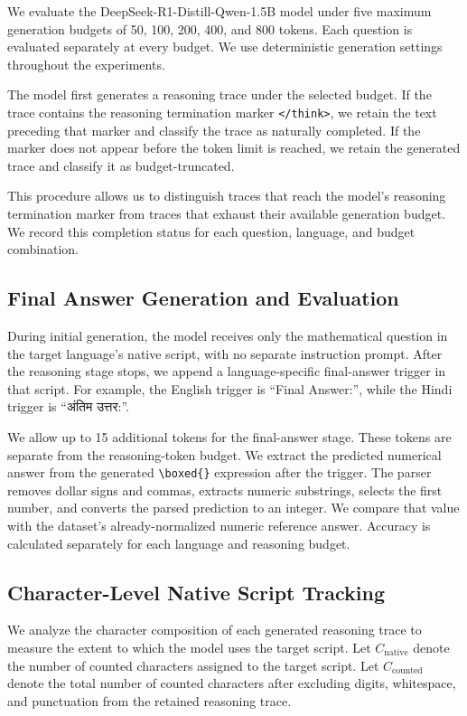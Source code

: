 \documentclass[11pt]{article}
\begin{document}
We evaluate the DeepSeek-R1-Distill-Qwen-1.5B model under five maximum generation budgets of 50, 100, 200, 400, and 800 tokens. Each question is evaluated separately at every budget. We use deterministic generation settings throughout the experiments.

The model first generates a reasoning trace under the selected budget. If the trace contains the reasoning termination marker \texttt{</think>}, we retain the text preceding that marker and classify the trace as naturally completed. If the marker does not appear before the token limit is reached, we retain the generated trace and classify it as budget-truncated.

This procedure allows us to distinguish traces that reach the model's reasoning termination marker from traces that exhaust their available generation budget. We record this completion status for each question, language, and budget combination.

\subsection{Final Answer Generation and Evaluation}
\label{sec:method_answer}

During initial generation, the model receives only the mathematical question in the target language's native script, with no separate instruction prompt. After the reasoning stage stops, we append a language-specific final-answer trigger in that script. For example, the English trigger is ``Final Answer:'', while the Hindi trigger is ``{\hindifont अंतिम उत्तर:}''.

We allow up to 15 additional tokens for the final-answer stage. These tokens are separate from the reasoning-token budget. We extract the predicted numerical answer from the generated \texttt{\textbackslash boxed\{\}} expression after the trigger. The parser removes dollar signs and commas, extracts numeric substrings, selects the first number, and converts the parsed prediction to an integer. We compare that value with the dataset's already-normalized numeric reference answer. Accuracy is calculated separately for each language and reasoning budget.

\subsection{Character-Level Native Script Tracking}
\label{sec:method_script}

We analyze the character composition of each generated reasoning trace to measure the extent to which the model uses the target script. Let $C_{\text{native}}$ denote the number of counted characters assigned to the target script. Let $C_{\text{counted}}$ denote the total number of counted characters after excluding digits, whitespace, and punctuation from the retained reasoning trace.
\end{document}
